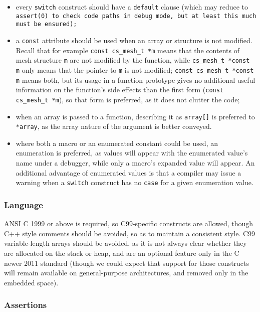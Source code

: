 \begin{itemize}
\item every \texttt{switch} construct should have a \texttt{default}
  clause (which may reduce to \texttt{assert(0) to check code paths in
  debug mode, but at least this much must be ensured);}

\item a \texttt{const} attribute should be used when an array or structure
  is not  modified. Recall that for example \texttt{const cs\_mesh\_t *m}
  means that the contents of mesh structure \texttt{m} are not modified
  by the function, while \texttt{cs\_mesh\_t *const m} only means that
  the pointer to \texttt{m} is not modified;
  \texttt{const cs\_mesh\_t *const m} means both, but its usage in
  a function prototype gives no additional useful information on
  the function's side effects than the first form
  (\texttt{const cs\_mesh\_t *m}), so that form is preferred, as it
  does not clutter the code;

\item when an array is passed to a function, describing it as
  \texttt{array[]} is preferred to \texttt{*array}, as the array
  nature of the argument is better conveyed.

\item where both a macro or an enumerated constant could be used,
  an enumeration is preferred, as values will appear with the
  enumerated value's name under a debugger, while only a macro's
  expanded value will appear. An additional advantage of enumerated
  values is that a compiler may issue a warning when a \texttt{switch}
  construct has no \texttt{case} for a given enumeration value.
\end{itemize}

\subsubsection{Language\label{sec:regle.lang}}

ANSI C 1999 or above is required, so C99-specific constructs are allowed,
though C++ style comments should be avoided, so as to maintain a consistent
style. C99 variable-length arrays should be avoided, as it is not
always clear whether they are allocated on the stack or heap, and are
an optional feature only in the C newer 2011 standard (though we could
expect that support for those constructs will remain available on
general-purpose architectures, and removed only in the embedded space).

\subsubsection{Assertions}

